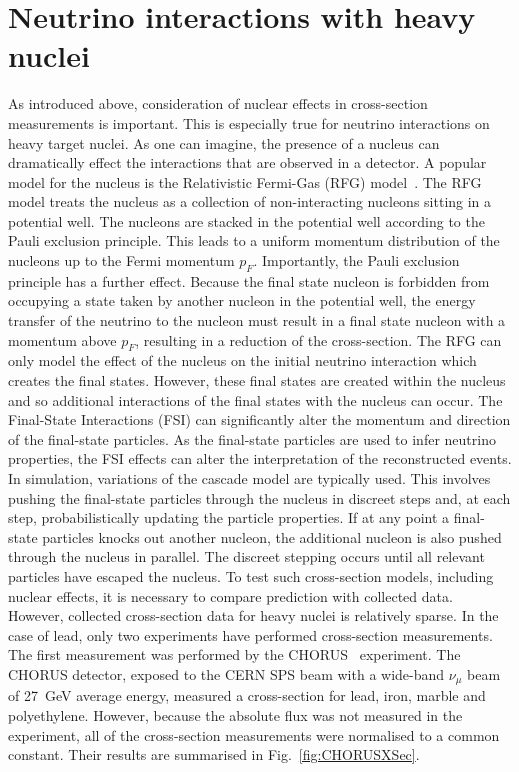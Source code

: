 \section{Neutrino interactions with heavy nuclei}
\label{sec:NeutrinoInteractionsHeavyNuclei}
As introduced above, consideration of nuclear effects in cross-section measurements is important.  This is especially true for neutrino interactions on heavy target nuclei.  As one can imagine, the presence of a nucleus can dramatically effect the interactions that are observed in a detector.  A popular model for the nucleus is the Relativistic Fermi-Gas (RFG) model~\cite{Smith:1972xh}.  The RFG model treats the nucleus as a collection of non-interacting nucleons sitting in a potential well.  The nucleons are stacked in the potential well according to the Pauli exclusion principle.  This leads to a uniform momentum distribution of the nucleons up to the Fermi momentum $p_F$.  Importantly, the Pauli exclusion principle has a further effect.  Because the final state nucleon is forbidden from occupying a state taken by another nucleon in the potential well, the energy transfer of the neutrino to the nucleon must result in a final state nucleon with a momentum above $p_F$, resulting in a reduction of the cross-section.
\newline
\newline
The RFG can only model the effect of the nucleus on the initial neutrino interaction which creates the final states.  However, these final states are created within the nucleus and so additional interactions of the final states with the nucleus can occur.  The Final-State Interactions (FSI) can significantly alter the momentum and direction of the final-state particles.  As the final-state particles are used to infer neutrino properties, the FSI effects can alter the interpretation of the reconstructed events.  In simulation, variations of the cascade model are typically used.  This involves pushing the final-state particles through the nucleus in discreet steps and, at each step, probabilistically updating the particle properties.  If at any point a final-state particles knocks out another nucleon, the additional nucleon is also pushed through the nucleus in parallel.  The discreet stepping occurs until all relevant particles have escaped the nucleus.
\newline
\newline
To test such cross-section models, including nuclear effects, it is necessary to compare prediction with collected data.  However, collected cross-section data for heavy nuclei is relatively sparse.  In the case of lead, only two experiments have performed cross-section measurements.  The first measurement was performed by the CHORUS~\cite{CHORUS_XSEC} experiment.  The CHORUS detector, exposed to the CERN SPS beam with a wide-band $\nu_\mu$ beam of 27~GeV average energy, measured a cross-section for lead, iron, marble and polyethylene.  However, because the absolute flux was not measured in the experiment, all of the cross-section measurements were normalised to a common constant.  Their results are summarised in Fig.~\ref{fig:CHORUSXSec}.

